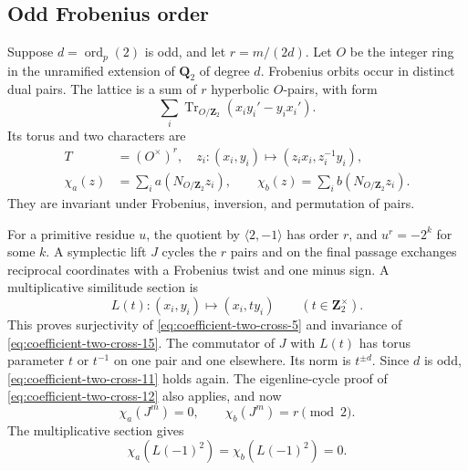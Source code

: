 \subsection{Odd Frobenius order}

Suppose \(d=\operatorname{ord}_p(2)\) is odd, and let
\(r=m/(2d)\). Let \(O\) be the integer ring in the
unramified extension of \(\mathbf Q_2\) of degree
\(d\). Frobenius orbits occur in distinct dual pairs.
The lattice is a sum of \(r\) hyperbolic \(O\)-pairs,
with form
\[
 \sum_i\operatorname{Tr}_{O/\mathbf Z_2}
                         (x_i y_i'-y_i x_i').
\]
Its torus and two characters are
\begin{equation}
 \begin{split}
 T&=(O^\times)^r,
       \quad z_i:(x_i,y_i)\longmapsto(z_i x_i,z_i^{-1}y_i),\\
 \chi_a(z)&=\sum_i a(N_{O/\mathbf Z_2}z_i),
       \qquad
 \chi_b(z)=\sum_i b(N_{O/\mathbf Z_2}z_i).
 \end{split}                                             \label{eq:coefficient-two-cross-15}
\end{equation}
They are invariant under Frobenius, inversion, and
permutation of pairs.

For a primitive residue \(u\), the quotient by
\(\langle2,-1\rangle\) has order \(r\), and
\(u^r=-2^k\) for some \(k\). A symplectic lift \(J\)
cycles the \(r\) pairs and on the final passage
exchanges reciprocal coordinates with a Frobenius
twist and one minus sign. A multiplicative similitude
section is
\[
           L(t):(x_i,y_i)\longmapsto(x_i,t y_i)
              \qquad(t\in\mathbf Z_2^\times).
\]
This proves surjectivity of \eqref{eq:coefficient-two-cross-5} and invariance of \eqref{eq:coefficient-two-cross-15}.
The commutator of \(J\) with \(L(t)\) has torus
parameter \(t\) or \(t^{-1}\) on one pair and one
elsewhere. Its norm is \(t^{\pm d}\). Since \(d\)
is odd, \eqref{eq:coefficient-two-cross-11} holds again. The eigenline-cycle proof
of \eqref{eq:coefficient-two-cross-12} also applies, and now
\begin{equation}
               \chi_a(J^m)=0,\qquad \chi_b(J^m)=r\pmod2.
                                                        \label{eq:coefficient-two-cross-16}
\end{equation}
The multiplicative section gives
\begin{equation}
                     \chi_a(L(-1)^2)
                         =\chi_b(L(-1)^2)=0.              \label{eq:coefficient-two-cross-17}
\end{equation}

